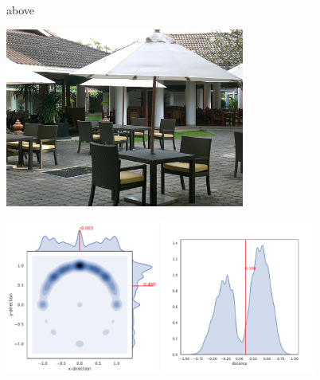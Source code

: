 \begin{figure}
	\centering
	\begin{minipage}{0.1\textwidth}
		\centering
		above
	\end{minipage}%
	\begin{minipage}{0.3\textwidth}
		\centering
		\includegraphics[width=0.7\textwidth]{studies/sc2020/figures/2407611_umbrella_above_table.jpg}
	\end{minipage}%
	\begin{minipage}{0.6\textwidth}
		\centering
		\includegraphics[width=0.45\textwidth]{studies/sc2020/figures/above_xy.pdf}
		\includegraphics[width=0.45\textwidth]{studies/sc2020/figures/above_d.pdf}
	\end{minipage}\\%

\end{figure}
